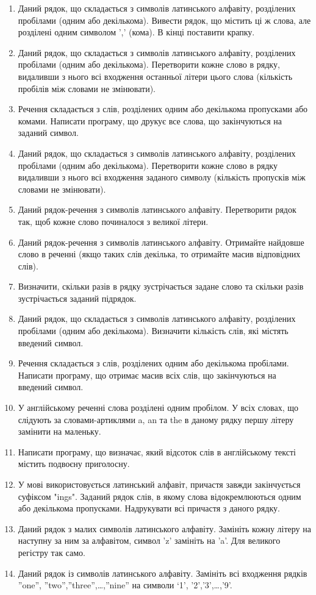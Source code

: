 \documentclass[a5paper,titlepage,openany,twoside,
]
{book_unv}%
\begin{document}
\begin{enumerate}
\def\labelenumi{\arabic{enumi})}
\setcounter{enumi}{6}
\item
  Даний рядок, що складається з символів латинського алфавіту,
  розділених пробілами (одним або декількома). Вивести рядок, що містить
  ці ж слова, але розділені одним символом ',' (кома). В кінці
  поставити крапку.
\item
  Даний рядок, що складається з символів латинського алфавіту,
  розділених пробілами (одним або декількома). Перетворити кожне слово в
  рядку, видаливши з нього всі входження останньої літери цього слова
  (кількість пробілів між словами не змінювати).
\item
  Речення складається з слів, розділених одним або декількома
  пропусками або комами. Написати програму, що друкує все слова, що закінчуються на
  заданий символ.
\item
  Даний рядок, що складається з символів латинського алфавіту,
  розділених пробілами (одним або декількома). Перетворити кожне слово в
  рядку видаливши з нього всі входження заданого символу (кількість
  пропусків між словами не змінювати).
\item
  Даний рядок-речення з символів латинського алфавіту. Перетворити рядок
  так, щоб кожне слово починалося з великої літери.
\item
  Даний рядок-речення з символів латинського алфавіту. Отримайте найдовше
  слово в реченні (якщо таких слів декілька, то отримайте масив відповідних слів).
\item
  Визначити, скільки разів в рядку зустрічається задане слово та скільки разів 
зустрічається заданий підрядок.
\item
  Даний рядок, що складається з символів латинського алфавіту,
  розділених пробілами (одним або декількома). Визначити кількість слів,
  які містять введений символ.
\item
  Речення складається з слів, розділених одним або декількома
  пробілами. Написати програму, що отримає масив всіх слів, що закінчуються на
  введений символ.
\item
  У англійському реченні слова розділені одним пробілом. У всіх словах, що 
слідують за словами-артиклями a, an та the в даному рядку першу літеру замінити на маленьку.

\item
  Написати програму, що визначає, який відсоток слів в англійському
  тексті містить подвоєну приголосну.
\item
  У мові використовується латинський алфавіт, причастя завжди
  закінчується суфіксом "ings". Заданий рядок слів, в якому слова
  відокремлюються одним або декількома пропусками. Надрукувати всі причастя
  з даного рядку.
\item
  Даний рядок з малих символів латинського алфавіту. Замініть кожну літеру
  на наступну за ним за алфавітом, символ 'z' замініть на 'a'. Для великого
регістру так само.
\item
  Даний рядок із символів латинського алфавіту. Замініть всі входження
  рядків ''one'', ''two'',''three'',\ldots{},''nine'' на символи `1',
  '2','3',\ldots{},'9'.


\end{enumerate}
\end{document}

